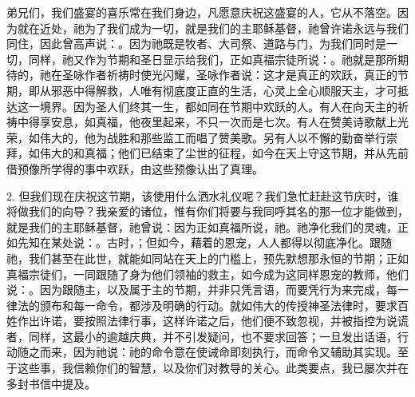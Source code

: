 弟兄们，我们盛宴的喜乐常在我们身边，凡愿意庆祝这盛宴的人，它从不落空。因为就在近处，祂为了我们成为一切，就是我们的主耶稣基督，祂曾许诺永远与我们同住，因此曾高声说：。因为祂既是牧者、大司祭、道路与门，为我们同时是一切，同样，祂又作为节期和圣日显示给我们，正如真福宗徒所说：。祂就是那所期待的，祂在圣咏作者祈祷时使光闪耀，圣咏作者说：这才是真正的欢跃，真正的节期，即从邪恶中得解救，人唯有彻底度正直的生活，心灵上全心顺服天主，才可抵达这一境界。因为圣人们终其一生，都如同在节期中欢跃的人。有人在向天主的祈祷中得享安息，如真福，他夜里起来，不只一次而是七次。有人在赞美诗歌献上光荣，如伟大的，他为战胜和那些监工而唱了赞美歌。另有人以不懈的勤奋举行崇拜，如伟大的和真福；他们已结束了尘世的征程，如今在天上守这节期，并从先前借预像所学得的事中欢跃，由这些预像认出了真理。\par

2. 但我们现在庆祝这节期，该使用什么洒水礼仪呢？我们急忙赶赴这节庆时，谁将做我们的向导？我亲爱的诸位，惟有你们将要与我同呼其名的那一位才能做到，就是我们的主耶稣基督，祂曾说：因为正如真福所说，祂。祂净化我们的灵魂，正如先知在某处说：。古时，；但如今，藉着的恩宠，人人都得以彻底净化。跟随祂，我们甚至在此世，就能如同站在天上的门槛上，预先默想那永恒的节期；正如真福宗徒们，一同跟随了身为他们领袖的救主，如今成为这同样恩宠的教师，他们说：。因为跟随主，以及属于主的节期，并非只凭言语，而要凭行为来完成，每一律法的颁布和每一命令，都涉及明确的行动。就如伟大的传授神圣法律时，要求百姓作出许诺，要按照法律行事，这样许诺之后，他们便不致忽视，并被指控为说谎者，同样，这最小的逾越庆典，并不引发疑问，也不要求回答；一旦发出话语，行动随之而来，因为祂说：祂的命令意在使诫命即刻执行，而命令又辅助其实现。至于这些事，我信赖你们的智慧，以及你们对教导的关心。此类要点，我已屡次并在多封书信中提及。\par

